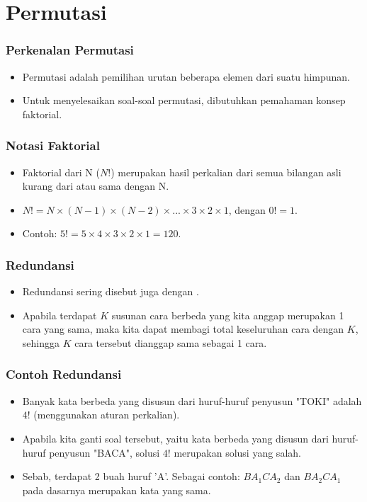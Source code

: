 \section{Permutasi}
\frame{\sectionpage}

\begin{frame}
\frametitle{Perkenalan Permutasi}
\begin{itemize}
  \item Permutasi adalah pemilihan urutan beberapa elemen dari suatu himpunan.
  \item Untuk menyelesaikan soal-soal permutasi, dibutuhkan pemahaman konsep faktorial.
\end{itemize}
\end{frame}

\begin{frame}
\frametitle{Notasi Faktorial}
\begin{itemize}
  \item Faktorial dari N ($N!$) merupakan hasil perkalian dari semua bilangan asli kurang dari atau sama dengan N.
  \item $N! = N \times (N-1) \times (N-2) \times ... \times 3 \times 2 \times 1$, dengan $0! = 1$.
  \item Contoh: $5! = 5 \times 4 \times 3 \times 2 \times 1 = 120$.
\end{itemize}
\end{frame}

\begin{frame}
\frametitle{Redundansi}
\begin{itemize}
  \item Redundansi sering disebut juga dengan .
  \item Apabila terdapat $K$ susunan cara berbeda yang kita anggap merupakan 1 cara yang sama, maka kita dapat membagi total keseluruhan cara dengan $K$, sehingga $K$ cara tersebut dianggap sama sebagai 1 cara.
\end{itemize}
\end{frame}

\begin{frame}
\frametitle{Contoh Redundansi}
\begin{itemize}
  \item Banyak kata berbeda yang disusun dari huruf-huruf penyusun "TOKI" adalah $4!$ (menggunakan aturan perkalian).
  \item Apabila kita ganti soal tersebut, yaitu kata berbeda yang disusun dari huruf-huruf penyusun "BACA", solusi $4!$ merupakan solusi yang salah.
  \item Sebab, terdapat 2 buah huruf 'A'. Sebagai contoh: $BA_{1}CA_{2}$ dan $BA_{2}CA_{1}$ pada dasarnya merupakan kata yang sama.
\end{itemize}
\end{frame}

